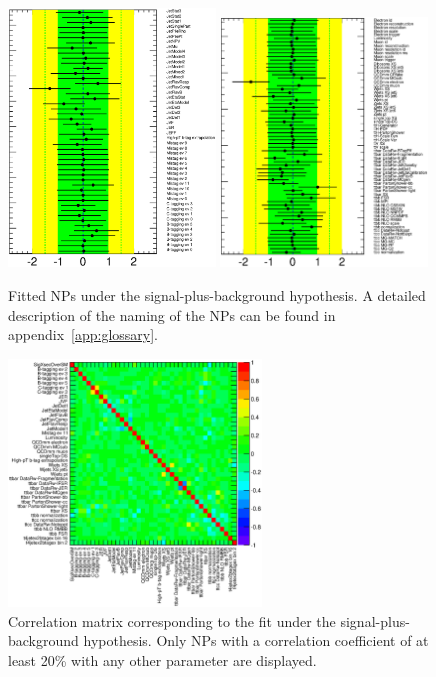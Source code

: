 \begin{figure}[!tp]
\begin{center}
\includegraphics[trim=0cm 0cm 1.5cm 0cm, clip=true, width=0.49\textwidth]{Analysis/Figures_ttH/detectorUNCljets_tesis.eps}
\includegraphics[trim=0cm 0cm 1.5cm 0cm, clip=true, width=0.49\textwidth]{Analysis/Figures_ttH/otherUNCljets_tesis.eps}
\caption{Fitted NPs under the signal-plus-background hypothesis. A detailed description of the naming of the NPs can be found in appendix~\ref{app:glossary}.}
\label{fig:ttH_fit} 
\end{center}
\begin{center}
\includegraphics[width=0.6\textwidth]{Analysis/Figures_ttH/CorrMat_ttH.eps}
\caption{Correlation matrix corresponding to the fit under the signal-plus-background hypothesis.
Only NPs with a correlation coefficient of at least 20\% with any other parameter are displayed.}
\label{fig:corrmat_ttH} 
\end{center}
\end{figure}

